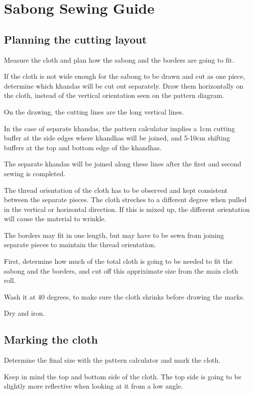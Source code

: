 \chapter{Sabong Sewing Guide}

\section{Planning the cutting layout}

Measure the cloth and plan how the sabong and the borders are going to
fit.

If the cloth is not wide enough for the sabong to be drawn and cut as
one piece, determine which khandas will be cut out separately. Draw them
horizontally on the cloth, instead of the vertical orientation seen on
the pattern diagram.

On the drawing, the cutting lines are the long vertical lines.

In the case of separate khandas, the pattern calculator implies a 1cm
cutting buffer at the side edges where khandhas will be joined, and
5-10cm shifting buffers at the top and bottom edge of the khandhas.

The separate khandas will be joined along these lines after the first
and second sewing is completed.

The thread orientation of the cloth has to be observed and kept
consistent between the separate pieces. The cloth streches to a
different degree when pulled in the vertical or horizontal direction. If
this is mixed up, the different orientation will cause the material to
wrinkle.

The borders may fit in one length, but may have to be sewn from joining
separate pieces to maintain the thread orientation.

First, determine how much of the total cloth is going to be needed to
fit the sabong and the borders, and cut off this appriximate size from
the main cloth roll.

Wash it at 40 degrees, to make sure the cloth shrinks before drawing the
marks.

Dry and iron.

\section{Marking the cloth}

Determine the final size with the pattern calculator and mark the cloth.

Keep in mind the top and bottom side of the cloth. The top side is going
to be slightly more reflective when looking at it from a low angle.

